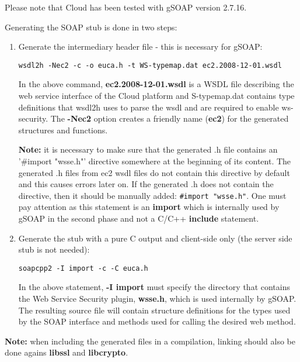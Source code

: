 Please note that \diet Cloud has been tested with gSOAP version 2.7.16.

Generating the SOAP stub is done in two steps:
\begin{enumerate}
\item{Generate the intermediary header file} - this is necessary for gSOAP:

\verb!wsdl2h -Nec2 -c -o euca.h -t WS-typemap.dat ec2.2008-12-01.wsdl!

In the above command, \textbf{ec2.2008-12-01.wsdl} is a WSDL file describing the web service
interface of the Cloud platform and S-typemap.dat contains type definitions that wsdl2h uses
to parse the wsdl and are required to enable ws-security. The \textbf{-Nec2} option creates
a friendly name (\textbf{ec2}) for the generated structures and functions.

\textbf{Note:} it is necessary to make sure that the generated .h file contains an '\#import "wsse.h"'
directive somewhere at the beginning of its content. The generated .h files from ec2 wsdl files do not
contain this directive by default and this causes errors later on. If the generated .h does not contain
the directive, then it should be manually added: \verb!#import "wsse.h"!. One must pay attention as this
statement is an \textbf{import} which is internally used by gSOAP in the second phase and not a C/C++
\textbf{include} statement.
\item{Generate the stub} with a pure C output and client-side only (the server side stub is not needed):

\verb!soapcpp2 -I import -c -C euca.h!

In the above statement, \textbf{-I import} must specify the directory that contains the Web Service Security plugin, \textbf{wsse.h}, which
is used internally by gSOAP. The resulting source file will contain structure definitions for the types
used by the SOAP interface and methods used for calling the desired web method.
\end{enumerate}

\textbf{Note:} when including the generated files in a compilation, linking should also be done agains
\textbf{libssl} and \textbf{libcrypto}.

